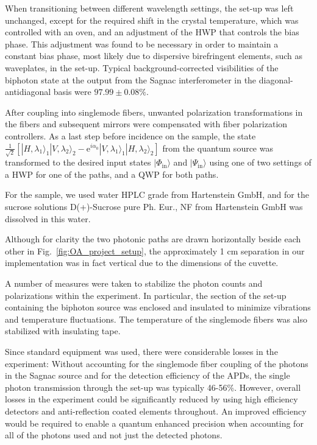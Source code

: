\documentclass[12pt,preprint]{revtex4}
\begin{document}
When transitioning between different wavelength settings, the set-up was left unchanged, except for the required shift in the crystal temperature, which was controlled with an oven, and an adjustment of the HWP that controls the bias phase. This adjustment was found to be necessary in order to maintain a constant bias phase, most likely due to dispersive birefringent elements, such as waveplates, in the set-up. Typical background-corrected visibilities of the biphoton state at the output from the Sagnac interferometer in the diagonal-antidiagonal basis were $97.99\pm 0.08\%$. 

After coupling into singlemode fibers, unwanted polarization transformations in the fibers and subsequent mirrors were compensated with fiber polarization controllers. As a last step before incidence on the sample, the state $\frac{1}{\sqrt{2}}\left[|H,\lambda_{1}\rangle_{1}|V,\lambda_{2}\rangle_{2}-\mathrm{e}^{i\alpha_{0}}|V,\lambda_{1}\rangle_{1}|H,\lambda_{2}\rangle_{2}\right]$ from the quantum source was transformed to the desired input states $|\Phi_{\mathrm{in}}\rangle$ and $|\Psi_{\mathrm{in}}\rangle$ using one of two settings of a HWP for one of the paths, and a QWP for both paths.

For the sample, we used water HPLC grade from Hartenstein GmbH, and for the sucrose solutions D(+)-Sucrose pure Ph. Eur., NF from Hartenstein GmbH was dissolved in this water.

Although for clarity the two photonic paths are drawn horizontally beside each other in Fig.\ \ref{fig:OA_project_setup}, the approximately 1 cm separation in our implementation was  in fact vertical due to the dimensions of the cuvette. 

A number of measures were taken to stabilize the photon counts and polarizations within the experiment. In particular, the section of the set-up containing the biphoton source was enclosed and insulated to minimize vibrations and temperature fluctuations. The temperature of the singlemode fibers was also stabilized with insulating tape. 

Since standard equipment was used, there were considerable losses in the experiment: Without accounting for the singlemode fiber coupling of the photons in the Sagnac source and for the detection efficiency of the APDs, the single photon transmission through the set-up was typically 46-56\%. However, overall losses in the experiment could be significantly reduced by using high efficiency detectors and anti-reflection coated elements throughout. An improved efficiency would be required to enable a quantum enhanced precision when accounting for all of the photons used and not just the detected photons.
\end{document}
